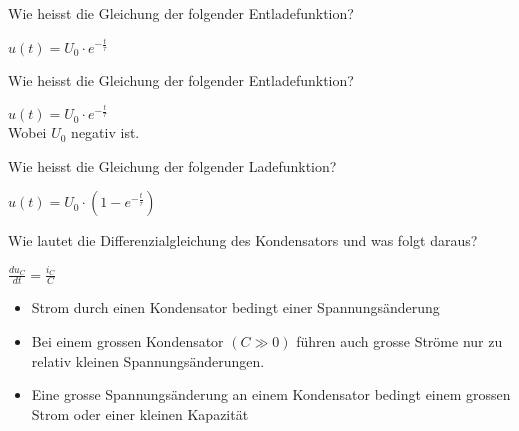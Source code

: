   
\begin{karte}{Wie heisst die Gleichung der folgender Entladefunktion?\\ }
  	\begin{center}
  		\huge
  		$u(t) = U_0 \cdot e^{-\frac{t}{\tau}} $
  	\end{center}
\end{karte}

\begin{karte}{Wie heisst die Gleichung der folgender Entladefunktion?\\ }
	\begin{center}
		\huge
		$u(t) = U_0 \cdot e^{-\frac{t}{\tau}} $\\[10pt]
		\normalsize
		Wobei $U_0$ negativ ist.
	\end{center}
\end{karte}

\begin{karte}{Wie heisst die Gleichung der folgender Ladefunktion?\\ }
	\begin{center}
		\huge
		$u(t) = U_0 \cdot (1 - e^{-\frac{t}{\tau}}) $
	\end{center}
\end{karte}

\begin{karte}{Wie lautet die Differenzialgleichung des Kondensators und was folgt daraus?}
	\begin{center}
		\huge
		$\frac{d u_{C}}{d t}=\frac{i_{C}}{C}$
	\end{center}
	\begin{itemize}
		\item Strom durch einen Kondensator bedingt einer Spannungsänderung
		\item Bei einem grossen Kondensator $(C \gg 0)$ führen auch grosse Ströme nur zu relativ kleinen Spannungsänderungen.
		\item Eine grosse Spannungsänderung an einem Kondensator bedingt einem grossen Strom oder einer kleinen Kapazität
	\end{itemize}
	
\end{karte}

